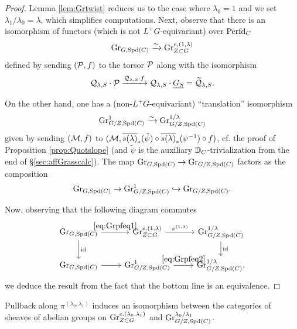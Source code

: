 \begin{proof}
Lemma \ref{lem:Grtwist} reduces us to the case where $\lambda_{0}=1$ and we set $\lambda_{1}/\lambda_{0} = \lambda$, which simplifies computations. Next, observe that there is an isomorphism of functors (which is not $L^{+}G$-equivariant) over $\mathrm{Perfd}_{C}$
    \begin{equation}\label{eq:Grpfeq1}
        \textnormal{Gr}_{G,\mathrm{Spd}(C)} \xrightarrow{\sim} \textnormal{Gr}_{Z \subset G}^{e,(1,\lambda)}
    \end{equation}
    defined by sending $(\mathcal{P},f)$ to the torsor $\mathcal{P}$ along with the isomorphism
\begin{equation*}
    \mathcal{Q}_{\lambda,S} \cdot \mathcal{P} \xrightarrow{\mathcal{Q}_{\lambda,S}\cdot f} \mathcal{Q}_{\lambda,S} \cdot \underline{G_{S}} = \widetilde{\mathcal{Q}}_{\lambda,S}.
\end{equation*}

On the other hand, one has a (non-$L^{+}G$-equivariant) ``translation'' isomorphism 
 \begin{equation}\label{eq:Grpfeq2}
     \textnormal{Gr}_{G/Z,\mathrm{Spd}(C)}^{1} \xrightarrow{\sim} \textnormal{Gr}_{G/Z,\mathrm{Spd}(C)}^{1/\lambda}
 \end{equation}
 given by sending $(\mathcal{M},f)$ to $(\mathcal{M}, \overline{s(\lambda)}_{*}(\tilde{\psi}) \circ \overline{s(\lambda)}_{*}(\psi^{-1}) \circ f)$, cf. the proof of Proposition \ref{prop:Quotslope} (and $\tilde{\psi}$ is the auxiliary $\mathbb D_{C}$-trivialization from the end of \S \ref{sec:affGrasscalc}). The map $\textnormal{Gr}_{G,\mathrm{Spd}(C)} \to \textnormal{Gr}_{G/Z,\mathrm{Spd}(C)}$ factors as the composition
 \begin{equation*}
     \textnormal{Gr}_{G,\mathrm{Spd}(C)} \to \textnormal{Gr}_{G/Z,\mathrm{Spd}(C)}^{1} \hookrightarrow \textnormal{Gr}_{G/Z,\mathrm{Spd}(C)}.
 \end{equation*}

 Now, observing that the following diagram commutes
 \[
\begin{tikzcd}
\tn{Gr}_{G,\Spd(C)} \arrow["\eqref{eq:Grpfeq1}"]{r} \arrow["\tn{id}"]{d} & \tn{Gr}_{Z \subset G}^{e,(1,\lambda)} \arrow["\pi^{(1,\lambda)}"]{r} & \tn{Gr}_{G/Z,\Spd(C)}^{1/\lambda} \arrow["\tn{id}"]{d} \\
\tn{Gr}_{G,\Spd(C)} \arrow{r} & \tn{Gr}_{G/Z,\Spd(C)}^{1} \arrow["\eqref{eq:Grpfeq2}"]{r} & \tn{Gr}_{G/Z,\Spd(C)}^{1/\lambda},
\end{tikzcd}
 \]
 we deduce the result from the fact that the bottom line is an equivalence.
\end{proof}

\begin{corol}\label{rque:sheafequiv}
   Pullback along $\pi^{(\lambda_{0},\lambda_{1})}$ induces an isomorphism between the categories of sheaves of abelian groups on $\textnormal{Gr}_{Z \subset G}^{e,(\lambda_{0},\lambda_{1})}$ and $\textnormal{Gr}_{G/Z,\mathrm{Spd}(C)}^{\lambda_{0}/\lambda_{1}}$.  
\end{corol}

